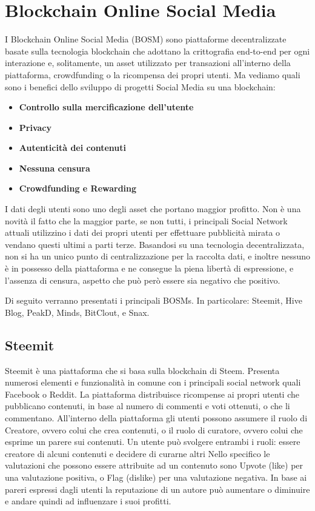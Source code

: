 \section{Blockchain Online Social Media}
I Blockchain Online Social Media (BOSM) \cite{guidi2020blockchain} sono piattaforme decentralizzate basate sulla tecnologia blockchain che adottano la crittografia end-to-end per ogni interazione e, solitamente, un asset utilizzato per transazioni all'interno della piattaforma, crowdfunding o la ricompensa dei propri utenti.
Ma vediamo quali sono i benefici dello sviluppo di progetti Social Media su una blockchain:
\\
\begin{itemize}
    \item \textbf{Controllo sulla mercificazione dell'utente} %
    \item \textbf{Privacy} %
    \item \textbf{Autenticità dei contenuti}
    \item \textbf{Nessuna censura}
    \item \textbf{Crowdfunding e Rewarding} %
\end{itemize}
I dati degli utenti sono uno degli asset che portano maggior profitto. Non è una novità il fatto che la maggior parte, se non tutti, i principali Social Network attuali utilizzino i dati dei propri utenti per effettuare pubblicità mirata o vendano questi ultimi a parti terze. Basandosi su una tecnologia decentralizzata, non si ha un unico punto di centralizzazione per la raccolta dati, e inoltre nessuno è in possesso della piattaforma e ne consegue la piena libertà di espressione, e l'assenza di censura, aspetto che può però essere sia negativo che positivo.

Di seguito verranno presentati i principali BOSMs. In particolare: Steemit, Hive Blog, PeakD, Minds, BitClout, e Snax.

\subsection{Steemit}
Steemit\cite{tarar2017Steemit,guidi2020steem,guidi2021socioeconomic} è una piattaforma che si basa sulla blockchain di Steem. Presenta numerosi elementi e funzionalità in comune con i principali social network quali Facebook o Reddit. La piattaforma distribuisce ricompense ai propri utenti che pubblicano contenuti, in base al numero di commenti e voti ottenuti, o che li commentano.
All'interno della piattaforma gli utenti possono assumere il ruolo di Creatore, ovvero colui che crea contenuti, o il ruolo di curatore, ovvero colui che esprime un parere sui contenuti. Un utente può svolgere entrambi i ruoli: essere creatore di alcuni contenuti e decidere di curarne altri Nello specifico le valutazioni che possono essere attribuite ad un contenuto sono Upvote (like) per una valutazione positiva, o Flag (dislike) per una valutazione negativa. In base ai pareri espressi dagli utenti la reputazione di un autore può aumentare o diminuire e andare quindi ad influenzare i suoi profitti. 

